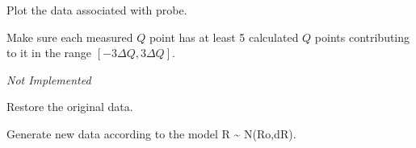 \documentclass[letterpaper,10pt,english]{sphinxmanual}
\begin{document}
\begin{fulllineitems}
\begin{fulllineitems}
\label{api/probe:refl1d.probe.QProbe.plot_log}
Plot the data associated with probe.

\end{fulllineitems}


\begin{fulllineitems}
\label{api/probe:refl1d.probe.QProbe.plot_residuals}
\end{fulllineitems}


\begin{fulllineitems}
\label{api/probe:refl1d.probe.QProbe.plot_resolution}
\end{fulllineitems}


\begin{fulllineitems}
\label{api/probe:refl1d.probe.QProbe.resolution_guard}
Make sure each measured $Q$ point has at least 5 calculated $Q$
points contributing to it in the range $[-3\Delta Q,3\Delta Q]$.

\emph{Not Implemented}

\end{fulllineitems}


\begin{fulllineitems}
\label{api/probe:refl1d.probe.QProbe.restore_data}
Restore the original data.

\end{fulllineitems}


\begin{fulllineitems}
\label{api/probe:refl1d.probe.QProbe.resynth_data}
Generate new data according to the model R \textasciitilde{} N(Ro,dR).


\end{fulllineitems}
\end{fulllineitems}
\end{document}
